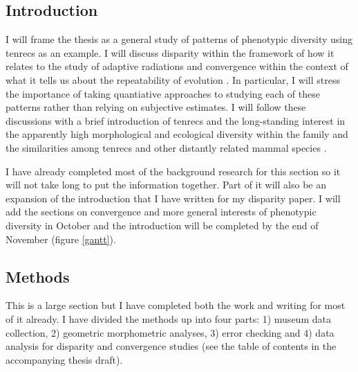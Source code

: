 \documentclass[12pt,a4paper]{article}
\begin{document}
\subsection{Introduction}

	I will frame the thesis as a general study of patterns of phenotypic diversity using tenrecs as an example.
	I will discuss disparity within the framework of how it relates to the study of adaptive radiations \citep{Losos2010a} and convergence within the context of what it tells us about the repeatability of evolution \citep[e.g][]{Blount2008}. In particular, I will stress the importance of taking quantiative approaches to studying each of these patterns rather than relying on subjective estimates. I will follow these discussions with a brief introduction of tenrecs and the long-standing interest in the apparently high morphological and ecological diversity within the family and the similarities among tenrecs and other distantly related mammal species \citep[e.g.][]{Eisenberg1969, Soarimalala2011, Olson2013}. 

	I have already completed most of the background research for this section so it will not take long to put the information together. Part of it will also be an expansion of the introduction that I have written for my disparity paper. I will add the sections on convergence and more general interests of phenotypic diversity in October and the introduction will be completed by the end of November (figure \ref*{gantt}).

\subsection{Methods}

	This is a large section but I have completed both the work and writing for most of it already.
	I have divided the methods up into four parts: 1) museum data collection, 2) geometric morphometric analyses, 3) error checking and 4) data analysis for disparity and convergence studies (see the table of contents in the accompanying thesis draft).
\end{document}
